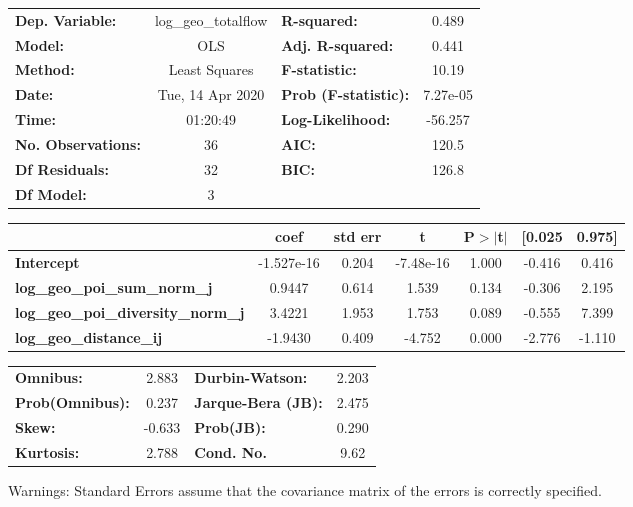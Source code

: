 \begin{center}
\begin{tabular}{lclc}
\toprule
\textbf{Dep. Variable:}                    & log\_geo\_totalflow & \textbf{  R-squared:         } &     0.489   \\
\textbf{Model:}                            &         OLS         & \textbf{  Adj. R-squared:    } &     0.441   \\
\textbf{Method:}                           &    Least Squares    & \textbf{  F-statistic:       } &     10.19   \\
\textbf{Date:}                             &   Tue, 14 Apr 2020  & \textbf{  Prob (F-statistic):} &  7.27e-05   \\
\textbf{Time:}                             &       01:20:49      & \textbf{  Log-Likelihood:    } &   -56.257   \\
\textbf{No. Observations:}                 &            36       & \textbf{  AIC:               } &     120.5   \\
\textbf{Df Residuals:}                     &            32       & \textbf{  BIC:               } &     126.8   \\
\textbf{Df Model:}                         &             3       & \textbf{                     } &             \\
\bottomrule
\end{tabular}
\begin{tabular}{lcccccc}
                                           & \textbf{coef} & \textbf{std err} & \textbf{t} & \textbf{P$> |$t$|$} & \textbf{[0.025} & \textbf{0.975]}  \\
\midrule
\textbf{Intercept}                         &   -1.527e-16  &        0.204     & -7.48e-16  &         1.000        &       -0.416    &        0.416     \\
\textbf{log\_geo\_poi\_sum\_norm\_j}       &       0.9447  &        0.614     &     1.539  &         0.134        &       -0.306    &        2.195     \\
\textbf{log\_geo\_poi\_diversity\_norm\_j} &       3.4221  &        1.953     &     1.753  &         0.089        &       -0.555    &        7.399     \\
\textbf{log\_geo\_distance\_ij}            &      -1.9430  &        0.409     &    -4.752  &         0.000        &       -2.776    &       -1.110     \\
\bottomrule
\end{tabular}
\begin{tabular}{lclc}
\textbf{Omnibus:}       &  2.883 & \textbf{  Durbin-Watson:     } &    2.203  \\
\textbf{Prob(Omnibus):} &  0.237 & \textbf{  Jarque-Bera (JB):  } &    2.475  \\
\textbf{Skew:}          & -0.633 & \textbf{  Prob(JB):          } &    0.290  \\
\textbf{Kurtosis:}      &  2.788 & \textbf{  Cond. No.          } &     9.62  \\
\bottomrule
\end{tabular}
\end{center}

Warnings: \newline
 [1] Standard Errors assume that the covariance matrix of the errors is correctly specified.